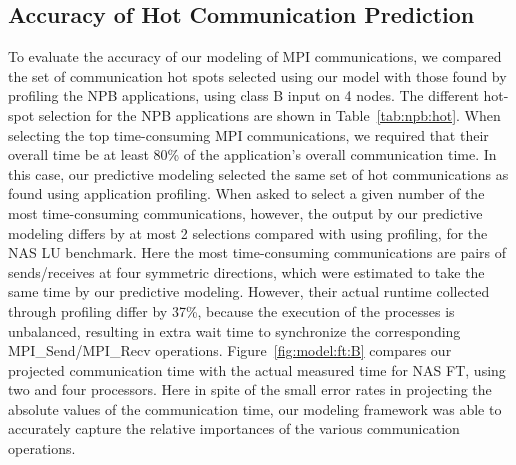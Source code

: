 \subsection{Accuracy of Hot Communication Prediction}

To evaluate the accuracy of our modeling of MPI communications, we
compared the set of communication hot spots selected using our model
with those found by profiling the NPB applications, using class B
input on 4 nodes.  The different hot-spot selection for the NPB
applications are shown in Table~\ref{tab:npb:hot}.  When selecting the
top time-consuming MPI communications, we required that their overall
time be at least 80\% of the application's overall communication time.
In this case, our predictive modeling selected the same set of hot
communications as found using application profiling.  When asked to
select a given number of the most time-consuming communications,
however, the output by our predictive modeling differs by at most 2
selections compared with using profiling, for the NAS LU benchmark.
Here the most time-consuming communications are pairs of
sends/receives at four symmetric directions, which were estimated to
take the same time by our predictive modeling.  However, their actual
runtime collected through profiling differ by 37\%, because the
execution of the processes is unbalanced, resulting in extra wait time
to synchronize the corresponding MPI\_Send/MPI\_Recv operations.
Figure~\ref{fig:model:ft:B} compares our projected communication time
with the actual measured time for NAS FT, using two and four
processors.  Here in spite of the small error rates in projecting the
absolute values of the communication time, our modeling framework was
able to accurately capture the relative importances of the various
communication operations.


